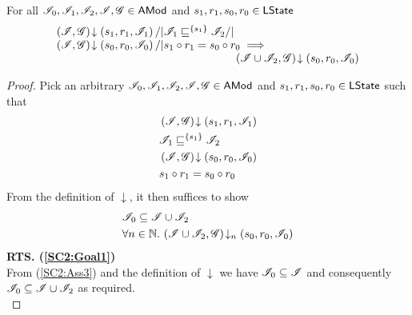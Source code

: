 \begin{lemma}\label{lem:shift-closure-2}
For all $\mathscr{I}_0, \mathscr{I}_1, \mathscr{I}_2, \mathscr{I}, \mathscr{G} \in \textsf{AMod}$ and  $s_1, r_1, s_0, r_0 \in \textsf{LState}$
%
\[
\begin{array}{@{} l @{\hspace{-1cm}} l @{} } 
	\extendsAM{\lmod, \gmod}{s_1}{r_1}{\lmod_1} /| \lmod_1 \weakenI{\{s_1\}} \lmod_2 /| \null & \\
	\extendsAM{\lmod, \gmod}{s_0}{r_0}{\lmod_0} /| s_1 \composeL r_1 = s_0 \composeL r_0 \implies & \\
	&\extendsAM{\lmod \cup \lmod_2, \gmod}{s_0}{r_0}{\lmod_0}
\end{array}
\]
%
\begin{proof} Pick an arbitrary $\mathscr{I}_0, \mathscr{I}_1, \mathscr{I}_2, \mathscr{I}, \mathscr{G} \in \textsf{AMod}$ and $s_1, r_1, s_0, r_0 \in \textsf{LState}$ such that 
%
\begin{align}
	& \left(\mathscr{I}, \mathscr{G}\right) \!\downarrow \left(s_1, r_1, \mathscr{I}_1\right) \label{SC2:Ass1}\\
	& \mathscr{I}_1 \sqsubseteq^{\{s_1\}} \mathscr{I}_2 \label{SC2:Ass2}\\
	& \left(\mathscr{I}, \mathscr{G}\right) \!\downarrow \left(s_0, r_0, \mathscr{I}_0\right) \label{SC2:Ass3}\\
	& s_1 \circ r_1 = s_0 \circ r_0 \label{SC2:Ass4}
\end{align} 
%
From the definition of $\downarrow$, it then suffices to show
%
\begin{align}
	& \mathscr{I}_0 \subseteq \mathscr{I} \cup \mathscr{I}_2\label{SC2:Goal1}\\
	& \forall n \in \mathbb{N}.\,  \left(\mathscr{I} \cup \mathscr{I}_2, \mathscr{G}\right) \!\downarrow_{n} \left(s_0, r_0, \mathscr{I}_0\right) \label{SC2:Goal2}
\end{align}
%
\noindent\textbf{RTS. (\ref{SC2:Goal1})} \\
From (\ref{SC2:Ass3}) and the definition of $\downarrow$ we have $\mathscr{I}_0 \subseteq \mathscr{I}$ and consequently $\mathscr{I}_0 \subseteq \mathscr{I} \cup \mathscr{I}_2$ as required.\\


\end{proof}
\end{lemma}
